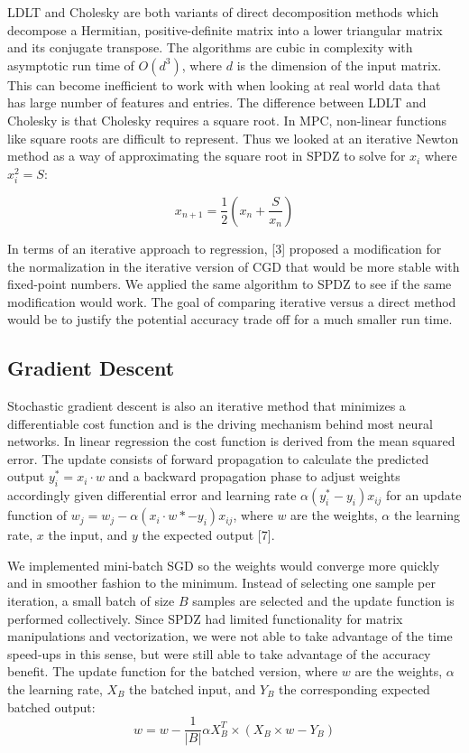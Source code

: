 \documentclass{article}
\begin{document}
LDLT and Cholesky are both variants of direct decomposition methods which decompose a Hermitian, positive-definite matrix into a lower triangular matrix and its conjugate transpose. The algorithms are cubic in complexity with asymptotic run time of $O(d^3)$, where $d$ is the dimension of the input matrix. This can become inefficient to work with when looking at real world data that has large number of features and entries. The difference between LDLT and Cholesky is that Cholesky requires a square root. In MPC, non-linear functions like square roots are difficult to represent. Thus we looked at an iterative Newton method as a way of approximating the square root in SPDZ to solve for $x_i$ where $x_{i}^2 = S$:

\[
x_{n+1} = \frac{1}{2} (x_{n} + \frac{S}{x_{n}})
\]

In terms of an iterative approach to regression, [3] proposed a modification for the normalization in the iterative version of CGD that would be more stable with fixed-point numbers. We applied the same algorithm to SPDZ to see if the same modification would work. The goal of comparing iterative versus a direct method would be to justify the potential accuracy trade off for a much smaller run time.

\subsection{Gradient Descent}

Stochastic gradient descent is also an iterative method that minimizes a differentiable cost function and is the driving mechanism behind most neural networks. In linear regression the cost function is derived from the mean squared error. The update consists of forward propagation to calculate the predicted output $y_i^* = x_i \cdot w$ and a backward propagation phase to adjust weights accordingly given differential error and learning rate $\alpha(y_i^*-y_i)x_{ij}$ for an update function of $w_j = w_j  - \alpha(x_i \cdot w *-y_i)x_{ij}$, where $w$ are the weights, $\alpha$ the learning rate, $x$ the input, and $y$ the expected output [7].

We implemented mini-batch SGD so the weights would converge more quickly and in smoother fashion to the minimum. Instead of selecting one sample per iteration, a small batch of size $B$ samples are selected and the update function is performed collectively. Since SPDZ had limited functionality for matrix manipulations and vectorization, we were not able to take advantage of the time speed-ups in this sense, but were still able to take advantage of the accuracy benefit. The update function for the batched version, where $w$ are the weights, $\alpha$ the learning rate, $X_{B}$ the batched input, and $Y_{B}$ the corresponding expected batched output: 
\[
 w = w - \frac{1}{|B|} \alpha X^{T}_{B} \times (X_{B} \times w - Y_{B})
\]
\end{document}
